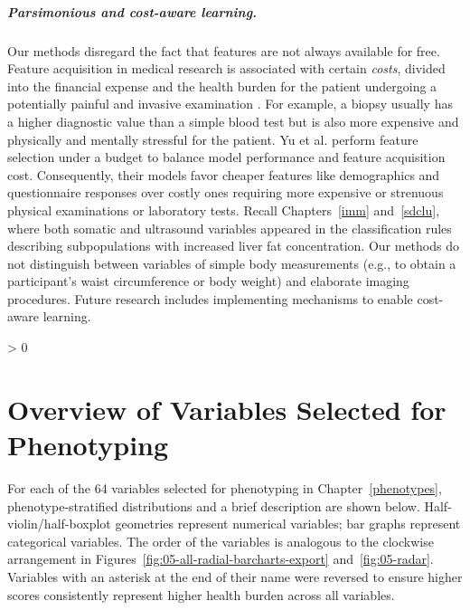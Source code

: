 \documentclass[
  oneside]{book}
\newlength{\cslhangindent}
\newenvironment{CSLReferences}[2] %
 {%
  \setlength{\parindent}{0pt}
  \ifodd #1 \everypar{\setlength{\hangindent}{\cslhangindent}}\ignorespaces\fi
  \ifnum #2 > 0
  \setlength{\parskip}{#2\baselineskip}
  \fi
 }%
 {}
\begin{document}
\paragraph*{Parsimonious and cost-aware learning.}

Our methods disregard the fact that features are not always available for free.
Feature acquisition in medical research is associated with certain \emph{costs}, divided into the financial expense and the health burden for the patient undergoing a potentially painful and invasive examination \autocite{kachuee2019costsensitive}.
For example, a biopsy usually has a higher diagnostic value than a simple blood test but is also more expensive and physically and mentally stressful for the patient.
Yu et al. \autocite{yu2020controlling} perform feature selection under a budget to balance model performance and feature acquisition cost.
Consequently, their models favor cheaper features like demographics and questionnaire responses over costly ones requiring more expensive or strenuous physical examinations or laboratory tests.
Recall Chapters~\ref{imm} and~\ref{sdclu}, where both somatic and ultrasound variables appeared in the classification rules describing subpopulations with increased liver fat concentration.
Our methods do not distinguish between variables of simple body measurements (e.g., to obtain a participant's waist circumference or body weight) and elaborate imaging procedures.
Future research includes implementing mechanisms to enable cost-aware learning.

\hypertarget{appendix-appendix}{%
\appendix}


\hypertarget{refs}{}
\begin{CSLReferences}{0}{0}
\end{CSLReferences}

\hypertarget{appx-pheno}{%
\chapter{Overview of Variables Selected for Phenotyping}\label{appx-pheno}}

For each of the 64 variables selected for phenotyping in Chapter~\ref{phenotypes}, phenotype-stratified distributions and a brief description are shown below.
Half-violin/half-boxplot geometries represent numerical variables;
bar graphs represent categorical variables.
The order of the variables is analogous to the clockwise arrangement in Figures~\ref{fig:05-all-radial-barcharts-export} and~\ref{fig:05-radar}.
Variables with an asterisk at the end of their name were reversed to ensure higher scores consistently represent higher health burden across all variables.
\end{document}
